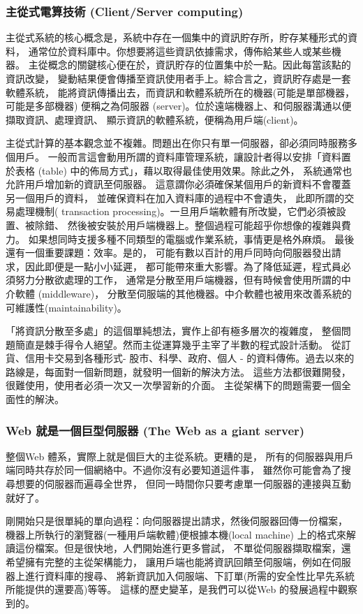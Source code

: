 \subsubsection{主從式電算技術 (Client/Server computing)} 
主從式系統的核心概念是，系統中存在一個集中的資訊貯存所，貯存某種形式的資料，
通常位於資料庫中。你想要將這些資訊依據需求，傳佈給某些人或某些機器。
主從概念的關鍵核心便在於，資訊貯存的位置集中於一點。因此每當該點的資訊改變，
變動結果便會傳播至資訊使用者手上。綜合言之，資訊貯存處是一套軟體系統，
能將資訊傳播出去，而資訊和軟體系統所在的機器(可能是單部機器，可能是多部機器)
便稱之為伺服器 (server)。位於遠端機器上、和伺服器溝通以便擷取資訊、處理資訊、
顯示資訊的軟體系統，便稱為用戶端(client)。

主從式計算的基本觀念並不複雜。問題出在你只有單一伺服器，卻必須同時服務多個用戶。
一般而言這會動用所謂的資料庫管理系統，讓設計者得以安排「資料置於表格 (table)
中的佈局方式」，藉以取得最佳使用效果。除此之外，
系統通常也允許用戶增加新的資訊至伺服器。
這意謂你必須確保某個用戶的新資料不會覆蓋另一個用戶的資料，
並確保資料在加入資料庫的過程中不會遺失， 此即所謂的交易處理機制( transaction
processing)。一旦用戶端軟體有所改變，它們必須被設置、被除錯、
然後被安裝於用戶端機器上。整個過程可能超乎你想像的複雜與費力。
如果想同時支援多種不同類型的電腦或作業系統，事情更是格外麻煩。
最後還有一個重要課題：效率。是的，
可能有數以百計的用戶同時向伺服器發出請求，因此即便是一點小小延遲，
都可能帶來重大影響。為了降低延遲，程式員必須努力分散欲處理的工作，
通常是分散至用戶端機器，但有時候會使用所謂的中介軟體 (middleware)，
分散至伺服端的其他機器。中介軟體也被用來改善系統的可維護性(maintainability)。

「將資訊分散至多處」的這個單純想法，實作上卻有極多層次的複雜度，
整個問題簡直是棘手得令人絕望。然而主從運算幾乎主宰了半數的程式設計活動。
從訂貨、信用卡交易到各種形式- 股市、科學、政府、個人 -
的資料傳佈。過去以來的路線是，每面對一個新問題，就發明一個新的解決方法。
這些方法都很難開發，很難使用，使用者必須一次又一次學習新的介面。
主從架構下的問題需要一個全面性的解決。
\subsubsection{Web 就是一個巨型伺服器 (The Web as a giant server)}
整個Web 體系，實際上就是個巨大的主從系統。更糟的是，
所有的伺服器與用戶端同時共存於同一個網絡中。不過你沒有必要知道這件事，
雖然你可能會為了搜尋想要的伺服器而遍尋全世界，
但同一時間你只要考慮單一伺服器的連接與互動就好了。

剛開始只是很單純的單向過程：向伺服器提出請求，然後伺服器回傳一份檔案，
機器上所執行的瀏覽器(一種用戶端軟體)便根據本機(local machine)
上的格式來解讀這份檔案。但是很快地，人們開始進行更多嘗試，
不單從伺服器擷取檔案，還希望擁有完整的主從架構能力，
讓用戶端也能將資訊回饋至伺服端，例如在伺服器上進行資料庫的搜尋、
將新資訊加入伺服端、下訂單(所需的安全性比早先系統所能提供的還要高)等等。
這樣的歷史變革，是我們可以從Web 的發展過程中觀察到的。


